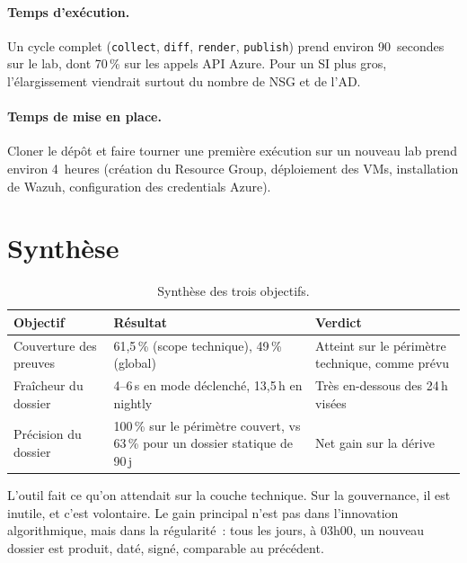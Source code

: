 \paragraph{Temps d'exécution.} Un cycle complet (\texttt{collect},
\texttt{diff}, \texttt{render}, \texttt{publish}) prend environ
90~secondes sur le lab,
dont 70\,\% sur les appels API Azure. Pour un SI plus gros,
l'élargissement viendrait surtout du nombre de NSG et de l'AD.

\paragraph{Temps de mise en place.} Cloner le dépôt et faire
tourner une première exécution sur un nouveau lab prend environ
4~heures (création du Resource Group, déploiement des VMs,
installation de Wazuh, configuration des credentials Azure).

\section{Synthèse}

\begin{table}[h]
\centering
\caption{Synthèse des trois objectifs.}
\label{tab:synthese}
\small
\begin{tabularx}{\textwidth}{lXX}
\toprule
\textbf{Objectif} & \textbf{Résultat} & \textbf{Verdict} \\
\midrule
Couverture des preuves & 61,5\,\% (scope technique), 49\,\% (global) & Atteint sur le périmètre technique, comme prévu \\
Fraîcheur du dossier & 4--6\,s en mode déclenché, 13,5\,h en nightly & Très en-dessous des 24\,h visées \\
Précision du dossier & 100\,\% sur le périmètre couvert, vs 63\,\% pour un dossier statique de 90\,j & Net gain sur la dérive \\
\bottomrule
\end{tabularx}
\end{table}

\begin{takeaway}
L'outil fait ce qu'on attendait sur la couche technique. Sur la
gouvernance, il est inutile, et c'est volontaire. Le gain
principal n'est pas dans l'innovation algorithmique, mais dans
la régularité~: tous les jours, à 03h00, un nouveau dossier est
produit, daté, signé, comparable au précédent.
\end{takeaway}
